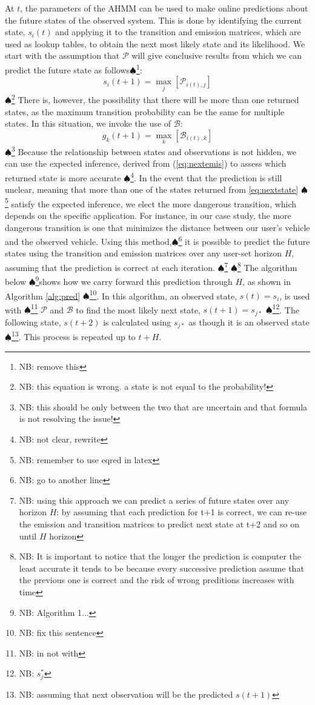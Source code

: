 \documentclass[letterpaper, 10 pt, conference]{ieeeconf}  %
\newcommand\NB[1]{$\spadesuit$\footnote{NB: #1}}
\begin{document}
 At $t$, the parameters of the AHMM can be used to make online predictions about the future states of the observed system. This is done by identifying the current state, $s_{i}(t)$ and applying it to the transition and emission matrices, which are used as lookup tables, to obtain the next most likely state and its likelihood. We start with the assumption that $\mathcal{P}$ will give conclusive results from which we can predict the future state as follows\NB{remove this}:
\begin{equation} \label{eq:nextstate}
    s_{i}(t+1) = \max_{j}[\mathcal{P}_{i(t),j}]
\end{equation}
\NB{this equation is wrong. a state is not equal to the probability!}
There is, however, the possibility that there will be more than one returned states, as the maximum transition probability can be the same for multiple states. In this situation, we invoke the use of $\mathcal{B}$:
\begin{equation} \label{eq:nextemis}
    g_{k}(t+1) = \max_{k}[\mathcal{B}_{i(t),k}]
\end{equation}
\NB{this should be only between the two that are uncertain and that formula is not resolving the issue! }
Because the relationship between states and observations is not hidden, we can use the expected inference, derived from (\ref{eq:nextemis}) to assess which returned state is more accurate \NB{not clear, rewrite}. In the event that the prediction is still unclear, meaning that more than one of the states returned from \eqref{eq:nextstate} \NB{remember to use eqred in latex} satisfy the expected inference, we elect the more dangerous transition, which depends on the specific application. For instance, in our case study, the more dangerous transition is one that minimizes the distance between our user's vehicle and the observed vehicle. Using this method,\NB{go to another line} it is possible to predict the future states using the transition and emission matrices over any user-set horizon $H$, assuming that the prediction is correct at each iteration. \NB{using this approach we can predict a series of future states over any horizon $H$: by assuming that each prediction for t+1 is correct, we can re-use the emission and transition matrices to predict next state at t+2 and so on until $H$ horizon} \NB{It is important to notice that the longer the prediction is computer the least accurate it tends to be because every successive prediction assume that the previous one is correct and the risk of wrong preditions increases with time}%
The algorithm below \NB{Algorithm 1...}shows how we carry forward this prediction through $H$, as shown in Algorithm \ref{alg:pred} \NB{fix this sentence}. In this algorithm, an observed state, $s(t) = s_i$, is used with \NB{in not with} $\mathcal P$ and $\mathcal B$ to find the most likely next state, $s(t+1) = s_{j*}$ \NB{$s_j^*$}. The following state, $s(t+2)$ is calculated using $s_{j*}$ as though it is an observed state \NB{assuming that next observation will be the predicted $s(t+1)$}. This process is repeated up to $t+H$. 
\end{document}
